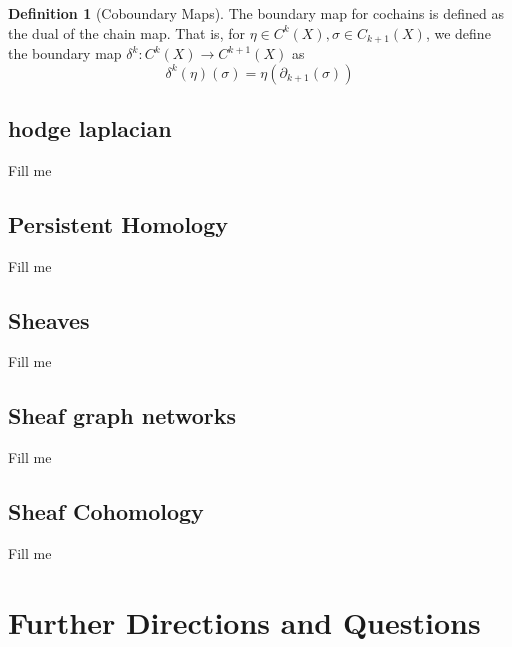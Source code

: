 \documentclass[12pt]{article}
\theoremstyle{plain}
\theoremstyle{definition}
\newtheorem{definition}[thm]{Definition}
\begin{document}
\begin{definition}[Coboundary Maps]
  The boundary map for cochains is defined as the dual of the chain map. That is, for $\eta \in C^k(X), \sigma \in C_{k+1}(X)$, 
  we define the boundary map
  $\delta^k: C^k(X) \to C^{k+1}(X)$ as 
  \begin{equation*}
    \delta^k(\eta)(\sigma) = \eta(\partial_{k+1}(\sigma))
  \end{equation*}
\end{definition}

\subsection{hodge laplacian}

Fill me 

\subsection{Persistent Homology}

Fill me


\subsection{Sheaves}

Fill me 

\subsection{Sheaf graph networks}

Fill me 

\subsection{Sheaf Cohomology}

Fill me

\section{Further Directions and Questions}
\end{document}
